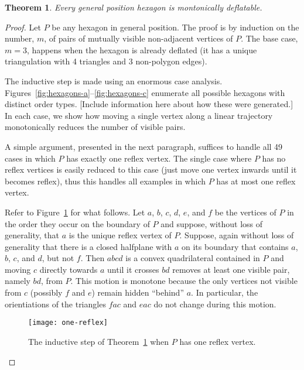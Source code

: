 \documentclass{article}
\newtheorem{theorem}{Theorem}
\begin{document}
\begin{theorem}\label{thm:hex-deflate}
Every general position hexagon is montonically deflatable.
\end{theorem}


\begin{proof}
Let $P$ be any hexagon in general position.  The proof is by induction on
the number, $m$, of pairs of mutually visible non-adjacent vertices of
$P$.  The base case, $m=3$, happens when the hexagon is already deflated
(it has a unique triangulation with 4 triangles and 3 non-polygon edges).

The inductive step is made using an enormous case analysis.
Figures~\ref{fig:hexagons-a}--\ref{fig:hexagons-c} enumerate all possible
hexagons with distinct order types.  [Include information here about
how these were generated.]  In each case, we show how moving a single
vertex along a linear trajectory monotonically reduces the number of
visible pairs.

A simple argument, presented in the next paragraph, suffices to handle
all 49 cases in which $P$ has exactly one reflex vertex.  The single
case where $P$ has no reflex vertices is easily reduced to this case
(just move one vertex inwards until it becomes reflex), thus this handles
all examples in which $P$ has at most one reflex vertex.

Refer to Figure~\ref{fig:one-reflex} for what follows.  Let $a$, $b$,
$c$, $d$, $e$, and $f$ be the vertices of $P$ in the order they occur on
the boundary of $P$ and suppose, without loss of generality, that $a$
is the unique reflex vertex of $P$.  Suppose, again without loss of
generality that there is a closed halfplane with $a$ on its boundary that
contains $a$, $b$, $c$, and $d$, but not $f$. Then $abcd$ is a convex
quadrilateral contained in $P$ and moving $c$ directly towards $a$ until
it crosses $bd$ removes at least one visible pair, namely $bd$, from $P$.
This motion is monotone because the only vertices not visible from $c$
(possibly $f$ and $e$) remain hidden ``behind'' $a$.  In particular,
the orientiations of the triangles $fac$ and $eac$ do not change during
this motion.

\begin{figure}
  \begin{center}
    \texttt{[image: one-reflex]}
  \end{center}
  \caption{The inductive step of Theorem~\ref{thm:hex-deflate} when $P$ has
    one reflex vertex.}
  \label{fig:one-reflex}
\end{figure}


\end{proof}
\end{document}
